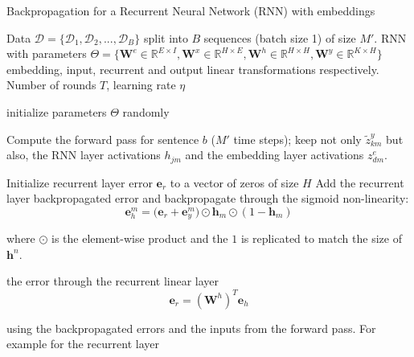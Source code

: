 \begin{algorithm}
\label{algo:rnnbackprop}
\caption{Backpropagation for a Recurrent Neural Network (RNN) with embeddings}
\begin{algorithmic}[1]

        Data $\mathcal{D}=\{\mathcal{D}_1,\mathcal{D}_2,...,\mathcal{D}_B\}$ split into $B$ sequences (batch size 1) of size $M'$. RNN with parameters $\Theta=\{\mathbf{W}^e \in \mathbb{R}^{E \times I}, \mathbf{W}^x \in \mathbb{R}^{H \times E}, \mathbf{W}^h \in \mathbb{R}^{H \times H}, \mathbf{W}^y \in \mathbb{R}^{K \times H} \}$ embedding, input, recurrent and output linear transformations respectively. Number of rounds $T$, learning rate $\eta$

   \STATE initialize parameters $\Theta$ randomly


	\vspace{0.3cm}
        \STATE Compute the {forward pass} for sentence $b$ ($M'$ time steps);
        keep not only $\tilde{z}_{km}^y$ but also, the RNN layer activations $h_{jm}$ and the embedding layer activations $z^e_{dm}$.
	\ENDFOR	
	\vspace{0.3cm}

	\ENDFOR	

    \STATE Initialize recurrent layer error $\mathbf{e}_r$ to a vector of zeros of size $H$
	\STATE Add the recurrent layer backpropagated error and backpropagate through the sigmoid non-linearity:
        $$\mathbf{e}^m_{h} = \Big(\mathbf{e}_{r} + \mathbf{e}^m_y\Big) \odot \mathbf{h}_m \odot (\mathbf{\mathrm{1}}-\mathbf{h}_m)$$

	\STATE where $\odot$ is the element-wise product and the $\mathbf{\mathrm{1}}$ is replicated to match the size of $\mathbf{h}^n$.

	 the error through the recurrent linear layer
    $$\mathbf{e}_r = (\mathbf{W}^h)^T \mathbf{e}_h$$

	\ENDFOR	

	\vspace{0.3cm}
     using the backpropagated errors and the inputs from the forward pass. For example for the recurrent layer


\end{algorithmic}
\end{algorithm}
